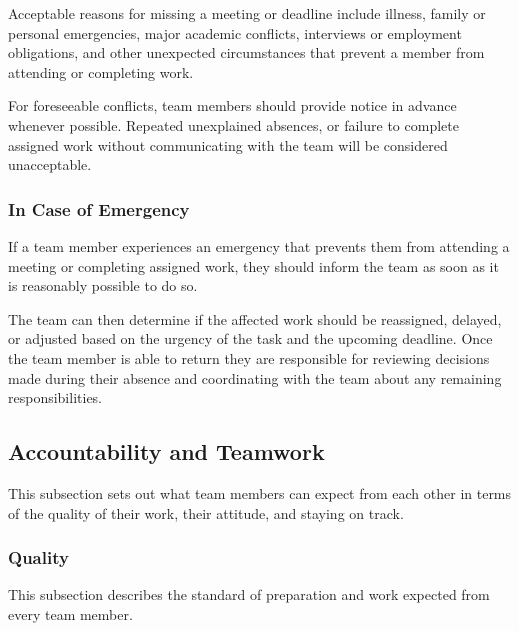 \documentclass{article}
\begin{document}
Acceptable reasons for missing a meeting or deadline include illness, family or personal emergencies,
major academic conflicts, interviews or employment obligations, and other
unexpected circumstances that prevent a member from attending or completing
work.

For foreseeable conflicts, team members should provide notice in advance whenever possible.
Repeated unexplained absences, or failure to complete assigned work without communicating with
the team will be considered unacceptable.

\subsubsection*{In Case of Emergency}

If a team member experiences an emergency that prevents them from attending a meeting
or completing assigned work, they should inform the team as soon as it is reasonably possible
to do so.

The team can then determine if the affected work should be reassigned, delayed, or adjusted
based on the urgency of the task and the upcoming deadline. Once the team member is able to return
they are responsible for reviewing decisions made during their absence and coordinating with the team 
about any remaining responsibilities.

\subsection*{Accountability and Teamwork}

This subsection sets out what team members can expect from each other in terms of the quality of their work, their attitude, and staying on track.

\subsubsection*{Quality}
\label{sec:quality}

This subsection describes the standard of preparation and work expected from every team member.
\end{document}
